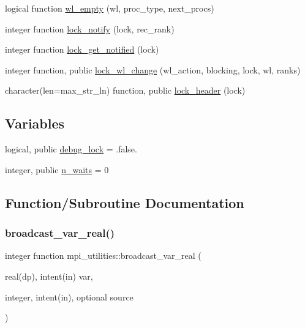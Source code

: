 \begin{DoxyCompactItemize}
\item 
logical function \hyperlink{namespacempi__utilities_a74e2e82b561f403ca8087c3925f76e29}{wl\+\_\+empty} (wl, proc\+\_\+type, next\+\_\+procs)
\item 
integer function \hyperlink{namespacempi__utilities_a5d2dbf8ffba124237c362f06c3d3ac32}{lock\+\_\+notify} (lock, rec\+\_\+rank)
\item 
integer function \hyperlink{namespacempi__utilities_a9ec02d2ade63716189369640f0da3c5f}{lock\+\_\+get\+\_\+notified} (lock)
\item 
integer function, public \hyperlink{namespacempi__utilities_a0417983d618bfc9f892d6d2af5d27b1d}{lock\+\_\+wl\+\_\+change} (wl\+\_\+action, blocking, lock, wl, ranks)
\item 
character(len=max\+\_\+str\+\_\+ln) function, public \hyperlink{namespacempi__utilities_a4c5de9472574b63c69212948d8a3f4e1}{lock\+\_\+header} (lock)
\end{DoxyCompactItemize}
\subsection*{Variables}
\begin{DoxyCompactItemize}
\item 
logical, public \hyperlink{namespacempi__utilities_a98291c400747762ea4e3f0d751c5d5f5}{debug\+\_\+lock} = .false.
\item 
integer, public \hyperlink{namespacempi__utilities_a38a87fa6a7efbd985592bbef4750f02b}{n\+\_\+waits} = 0
\end{DoxyCompactItemize}


\subsection{Function/\+Subroutine Documentation}
\mbox{\label{namespacempi__utilities_a7a7d740f6e847cd65e21b4f5d85a0ca7}} 
\subsubsection{\texorpdfstring{broadcast\+\_\+var\+\_\+real()}{broadcast\_var\_real()}}
{\footnotesize\ttfamily integer function mpi\+\_\+utilities\+::broadcast\+\_\+var\+\_\+real (\begin{DoxyParamCaption}\item[{real(dp), intent(in)}]{var,  }\item[{integer, intent(in), optional}]{source }\end{DoxyParamCaption})}



